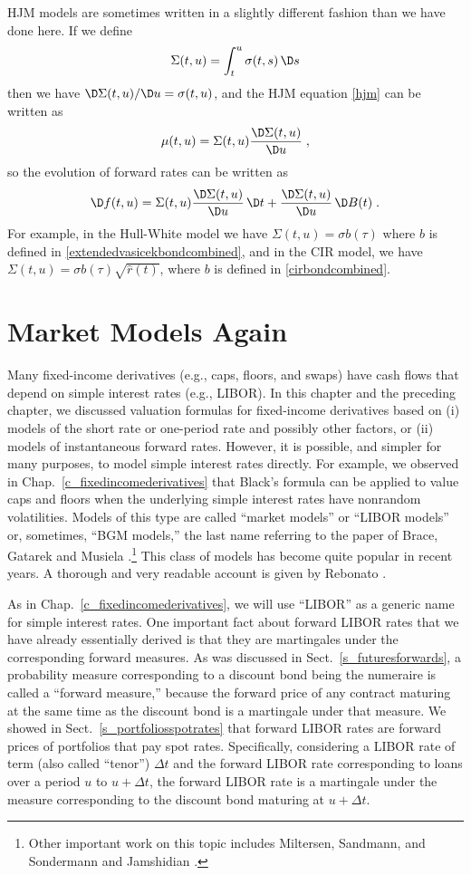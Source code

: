 HJM models are sometimes written in a slightly different fashion than we have done here.  If we define
$$\Sigma(t,u) = \int_t^u \sigma(t,s)\,\D s$$
then we have $\D \Sigma(t,u)/\D u = \sigma(t,u)$, and the HJM equation \eqref{hjm} can be written as
$$\mu(t,u) = \Sigma(t,u)\frac{\D \Sigma(t,u)}{\D u}\; ,$$
so the evolution of forward rates can be written as
$$\D f(t,u) = \Sigma(t,u)\frac{\D \Sigma(t,u)}{\D u}\,\D t + \frac{\D \Sigma(t,u)}{\D u}\,\D B(t)\; .$$
For example, in the Hull-White model we have $\Sigma(t,u) = \sigma b(\tau)$ where $b$ is defined in \eqref{extendedvasicekbondcombined}, and in the CIR model, we have $\Sigma(t,u) = \sigma b(\tau)\sqrt{\hat{r}(t)}$, where $b$ is defined in \eqref{cirbondcombined}.


\section{Market Models Again}

Many fixed-income derivatives (e.g., caps, floors, and swaps) have cash flows that depend on simple interest rates (e.g., LIBOR).   In this chapter and the preceding chapter, we discussed valuation formulas for fixed-income derivatives based on (i) models of the short rate or one-period rate and possibly other factors, or (ii) models of instantaneous forward rates.  However, it is possible, and simpler for many purposes, to model simple interest rates directly.  For example, we observed in Chap.~\ref{c_fixedincomederivatives} that Black's formula can be applied to value caps and floors when the underlying simple interest rates have nonrandom volatilities.  Models of this type are called ``market models'' or ``LIBOR models'' or, sometimes, ``BGM models,''  the last name referring to the paper of Brace, Gatarek and Musiela \cite{BGM}.\footnote{Other important work on this topic includes Miltersen, Sandmann, and Sondermann \cite{MSS} and Jamshidian \cite{Jamshidian97}.}   This class of models has become quite popular in recent years.  A thorough and very readable account is given by Rebonato \cite{Rebonato02}.  

As in Chap.~\ref{c_fixedincomederivatives}, we will use ``LIBOR'' as a generic name for simple interest rates. One important fact about forward LIBOR rates that we have already essentially derived is that they are martingales under the corresponding forward measures.   As was discussed in Sect.~\ref{s_futuresforwards}, a probability measure corresponding to a discount bond being the numeraire is called a ``forward measure,'' because the forward price of any contract maturing at the same time as the discount bond is a martingale under that measure.  We showed in Sect.~\ref{s_portfoliosspotrates} that  forward LIBOR rates  are forward prices of portfolios that pay spot rates.   Specifically, considering a LIBOR rate of term (also called ``tenor'') $\varDelta t$  and the forward LIBOR rate corresponding to loans over a period  $u$ to $u+\varDelta t$, the forward LIBOR rate is a martingale under the measure corresponding to the discount bond maturing at $u+\varDelta t$.




